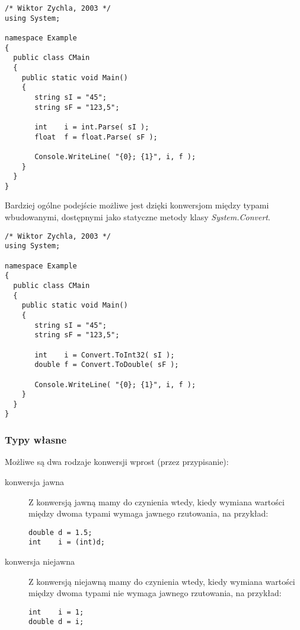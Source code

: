 \begin{scriptsize}
\begin{verbatim}
/* Wiktor Zychla, 2003 */
using System;

namespace Example
{
  public class CMain
  {    
    public static void Main()
    {
       string sI = "45";
       string sF = "123,5";

       int    i = int.Parse( sI );
       float  f = float.Parse( sF );

       Console.WriteLine( "{0}; {1}", i, f );
    }
  }
}
\end{verbatim}
\end{scriptsize}

Bardziej ogólne podejście możliwe jest dzięki konwersjom między typami wbudowanymi,
dostępnymi jako statyczne metody klasy {\em System.Convert}. 

\begin{scriptsize}
\begin{verbatim}
/* Wiktor Zychla, 2003 */
using System;

namespace Example
{
  public class CMain
  {    
    public static void Main()
    {
       string sI = "45";
       string sF = "123,5";

       int    i = Convert.ToInt32( sI );
       double f = Convert.ToDouble( sF );

       Console.WriteLine( "{0}; {1}", i, f );
    }
  }
}
\end{verbatim}
\end{scriptsize}

\subsubsection{Typy własne}

Możliwe są dwa rodzaje konwersji wprost (przez przypisanie):
\begin{description}
\item [konwersja jawna] Z konwersją jawną mamy do czynienia wtedy, kiedy wymiana wartości
między dwoma typami wymaga jawnego rzutowania, na przykład:
\begin{scriptsize}
\begin{verbatim}
double d = 1.5;
int    i = (int)d;
\end{verbatim}
\end{scriptsize}
\item [konwersja niejawna] Z konwersją niejawną mamy do czynienia wtedy, kiedy wymiana wartości
między dwoma typami nie wymaga jawnego rzutowania, na przykład:
\begin{scriptsize}
\begin{verbatim}
int    i = 1;
double d = i;
\end{verbatim}
\end{scriptsize}
\end{description}

